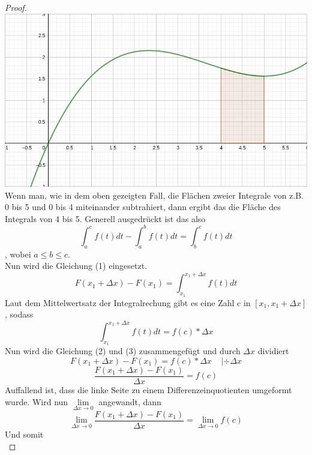 \documentclass[fontsize=12pt,paper=a4,DIV12,cleardoublepage=empty, 
liststotoc,idxtotoc,bibtotoc]{article}
\theoremstyle{plain}
\theoremstyle{definition}
\begin{document}
\begin{proof}
		\includegraphics[scale=0.2]{Integral 4-5.png} \\
Wenn man, wie in dem oben gezeigten Fall, die Flächen zweier Integrale von z.B. 0 bis 5 und 0 bis 4 miteinander subtrahiert, dann ergibt das die Fläche des Integrals von 4 bis 5. Generell ausgedrückt ist das also
		\begin{equation*}
			\int_{a}^{c}f(t)dt - \int_{a}^{b}f(t)dt = \int_{b}^{c}f(t)dt
		\end{equation*}
		, wobei $a\leq b\leq c$.\\
		Nun wird die Gleichung (1) eingesetzt.
		\begin{equation}
			F(x_1+\Delta x)-F(x_1)=\int_{x_1}^{x_1+\Delta x}f(t)dt
		\end{equation}
		Laut dem Mittelwertsatz der Integralrechung gibt es eine Zahl c in $[x_1, x_1+\Delta x]$, sodass
		\begin{equation}
			\int_{x_1}^{x_1+\Delta x}f(t)dt=f(c)*\Delta x
		\end{equation}
		Nun wird die Gleichung (2) und (3) zusammengefügt und durch $\Delta x$ dividiert
		\begin{equation*}
			F(x_1+\Delta x)-F(x_1)=f(c)*\Delta x \;\;\;\;|\div \Delta x
		\end{equation*}
		\begin{equation*}
			\frac{F(x_1+\Delta x)-F(x_1)}{\Delta x}=f(c)
		\end{equation*}
		Auffallend ist, dass die linke Seite zu einem Differenzeinquotienten umgeformt wurde. Wird nun $\lim \limits_{\Delta x \to 0}$ angewandt, dann
		\begin{equation*}
			\lim \limits_{\Delta x \to 0} \frac{F(x_1+\Delta x)-F(x_1)}{\Delta x}=\lim \limits_{\Delta x \to 0}f(c)
		\end{equation*}
		Und somit
		\begin{equation}

\end{equation}
\end{proof}
\end{document}
